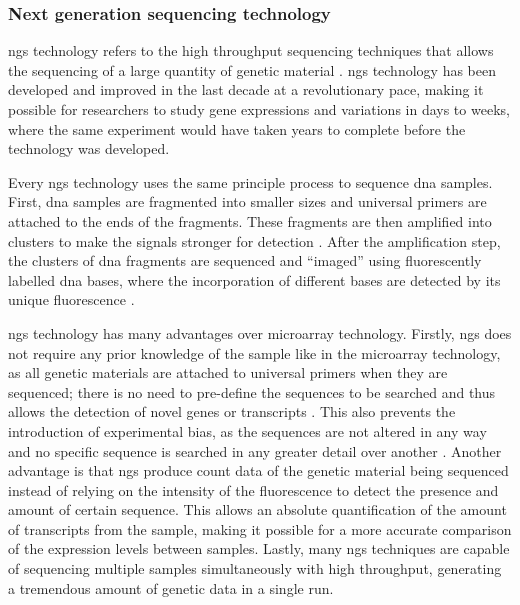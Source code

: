 \subsubsection{Next generation sequencing technology}
\label{ssub:next_generation_sequencing_technology}

\Gls{ngs} technology refers to the high throughput sequencing techniques that allows the sequencing of a large quantity of genetic material \citep{Metzker2010}.
\gls{ngs} technology has been developed and improved in the last decade at a revolutionary pace, making it possible for researchers to study gene expressions and variations in days to weeks, where the same experiment would have taken years to complete before the technology was developed.

Every \gls{ngs} technology uses the same principle process to sequence \acrshort{dna} samples.
First, \acrshort{dna} samples are fragmented into smaller sizes and universal primers are attached to the ends of the fragments.
These fragments are then amplified into clusters to make the signals stronger for detection \citep{Metzker2010}.
After the amplification step, the clusters of \acrshort{dna} fragments are sequenced and ``imaged'' using fluorescently labelled \acrshort{dna} bases, where the incorporation of different bases are detected by its unique fluorescence \citep{Metzker2010}.

\gls{ngs} technology has many advantages over microarray technology.
Firstly, \gls{ngs} does not require any prior knowledge of the sample like in the microarray technology, as all genetic materials are attached to universal primers when they are sequenced; there is no need to pre-define the sequences to be searched and thus allows the detection of novel genes or transcripts \citep{Hurd2009}.
This also prevents the introduction of experimental bias, as the sequences are not altered in any way and no specific sequence is searched in any greater detail over another \citep{Hurd2009}.
Another advantage is that \gls{ngs} produce count data of the genetic material being sequenced instead of relying on the intensity of the fluorescence to detect the presence and amount of certain sequence.
This allows an absolute quantification of the amount of transcripts from the sample, making it possible for a more accurate comparison of the expression levels between samples.
Lastly, many \gls{ngs} techniques are capable of sequencing multiple samples simultaneously with high throughput, generating a tremendous amount of genetic data in a single run.

